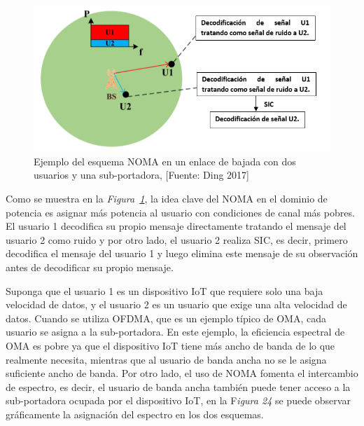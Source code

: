 \begin{figure}[th]
\centering
\includegraphics[scale=1]{Figures/Ejemplo del esquema NOMA en un enlace de bajada con dos usuarios y una sub-portadora}
\decoRule
\caption[Ejemplo del esquema NOMA en un enlace de bajada con dos usuarios y una sub-portadora.]{Ejemplo del esquema NOMA en un enlace de bajada con dos usuarios y una sub-portadora, [Fuente: Ding 2017]}
\label{fig:NOMADL}
\end{figure}

Como se muestra en la \textit{Figura~\ref{fig:NOMADL}}, la idea clave del NOMA en el dominio de potencia es asignar más potencia al usuario con condiciones de canal más pobres. El usuario 1 decodifica su propio mensaje directamente tratando el mensaje del usuario 2 como ruido y por otro lado, el usuario 2 realiza SIC, es decir, primero decodifica el mensaje del usuario 1 y luego elimina este mensaje de su observación antes de decodificar su propio mensaje.

Suponga que el usuario 1 es un dispositivo IoT que requiere solo una baja velocidad de datos, y el usuario 2 es un usuario que exige una alta velocidad de datos. Cuando se utiliza OFDMA, que es un ejemplo típico de OMA, cada usuario se asigna a la sub-portadora. En este ejemplo, la eficiencia espectral de OMA es pobre ya que el dispositivo IoT tiene más ancho de banda de lo que realmente necesita, mientras que al usuario de banda ancha no se le asigna suficiente ancho de banda. Por otro lado, el uso de NOMA fomenta el intercambio de espectro, es decir, el usuario de banda ancha también puede tener acceso a la sub-portadora ocupada por el dispositivo IoT, en la F\textit{igura 24} se puede observar gráficamente la asignación del espectro en los dos esquemas.

